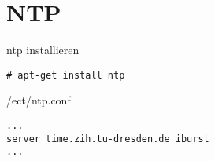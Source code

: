 \chapter{NTP}
ntp installieren
\begin{lstlisting}[style=Bash]
# apt-get install ntp
\end{lstlisting}
/ect/ntp.conf
\begin{lstlisting}[style=Bash]
...
server time.zih.tu-dresden.de iburst
...
\end{lstlisting}
